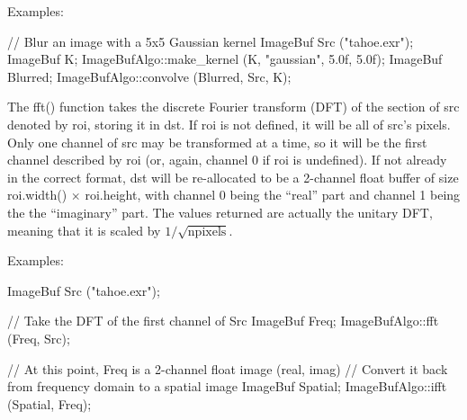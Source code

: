 \smallskip
\noindent Examples:
\begin{code}
    // Blur an image with a 5x5 Gaussian kernel
    ImageBuf Src ("tahoe.exr");
    ImageBuf K;
    ImageBufAlgo::make_kernel (K, "gaussian", 5.0f, 5.0f);
    ImageBuf Blurred;
    ImageBufAlgo::convolve (Blurred, Src, K);
\end{code}
\apiend

 
 

The {\cf fft()} function takes the discrete Fourier transform (DFT) of
the section of {\cf src} denoted by {\cf roi}, storing it in {\cf dst}.
If {\cf roi} is not defined, it will be all of {\cf src}'s pixels.  Only
one channel of {\cf src} may be transformed at a time, so it will be the
first channel described by {\cf roi} (or, again, channel 0 if {\cf roi}
is undefined).  If not already in the correct format, {\cf dst} will be
re-allocated to be a 2-channel {\cf float} buffer of size 
{\cf roi.width()} $\times$ {\cf roi.height}, with channel 0 being the
``real'' part and channel 1 being the the ``imaginary'' part.  The
values returned are actually the unitary DFT, meaning that it is scaled
by $1/\sqrt{\mathrm{npixels}}$.

\smallskip
\noindent Examples:
\begin{code}
    ImageBuf Src ("tahoe.exr");

    // Take the DFT of the first channel of Src
    ImageBuf Freq;
    ImageBufAlgo::fft (Freq, Src);

    // At this point, Freq is a 2-channel float image (real, imag)
    // Convert it back from frequency domain to a spatial image
    ImageBuf Spatial;
    ImageBufAlgo::ifft (Spatial, Freq);
\end{code}
\apiend

 
 
\NEW  %

